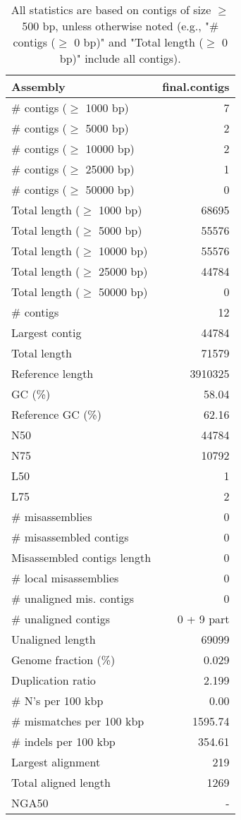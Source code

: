 \documentclass[12pt,a4paper]{article}
\begin{document}
\begin{table}[ht]
\begin{center}
\caption{All statistics are based on contigs of size $\geq$ 500 bp, unless otherwise noted (e.g., "\# contigs ($\geq$ 0 bp)" and "Total length ($\geq$ 0 bp)" include all contigs).}
\begin{tabular}{|l*{1}{|r}|}
\hline
Assembly & final.contigs \\ \hline
\# contigs ($\geq$ 1000 bp) & 7 \\ \hline
\# contigs ($\geq$ 5000 bp) & 2 \\ \hline
\# contigs ($\geq$ 10000 bp) & 2 \\ \hline
\# contigs ($\geq$ 25000 bp) & 1 \\ \hline
\# contigs ($\geq$ 50000 bp) & 0 \\ \hline
Total length ($\geq$ 1000 bp) & 68695 \\ \hline
Total length ($\geq$ 5000 bp) & 55576 \\ \hline
Total length ($\geq$ 10000 bp) & 55576 \\ \hline
Total length ($\geq$ 25000 bp) & 44784 \\ \hline
Total length ($\geq$ 50000 bp) & 0 \\ \hline
\# contigs & 12 \\ \hline
Largest contig & 44784 \\ \hline
Total length & 71579 \\ \hline
Reference length & 3910325 \\ \hline
GC (\%) & 58.04 \\ \hline
Reference GC (\%) & 62.16 \\ \hline
N50 & 44784 \\ \hline
N75 & 10792 \\ \hline
L50 & 1 \\ \hline
L75 & 2 \\ \hline
\# misassemblies & 0 \\ \hline
\# misassembled contigs & 0 \\ \hline
Misassembled contigs length & 0 \\ \hline
\# local misassemblies & 0 \\ \hline
\# unaligned mis. contigs & 0 \\ \hline
\# unaligned contigs & 0 + 9 part \\ \hline
Unaligned length & 69099 \\ \hline
Genome fraction (\%) & 0.029 \\ \hline
Duplication ratio & 2.199 \\ \hline
\# N's per 100 kbp & 0.00 \\ \hline
\# mismatches per 100 kbp & 1595.74 \\ \hline
\# indels per 100 kbp & 354.61 \\ \hline
Largest alignment & 219 \\ \hline
Total aligned length & 1269 \\ \hline
NGA50 & - \\ \hline
\end{tabular}
\end{center}
\end{table}
\end{document}
